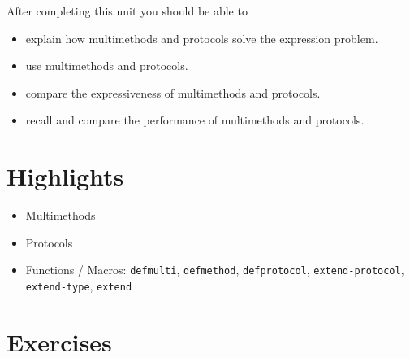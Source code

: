 \documentclass[11pt,a4paper]{article}
\begin{document}
After completing this unit you should be able to

\begin{itemize}
    \item explain how multimethods and protocols solve the expression problem.
    \item use multimethods and protocols.
    \item compare the expressiveness of multimethods and protocols.
    \item recall and compare the performance of multimethods and protocols.
\end{itemize}

\section{Highlights}

\begin{itemize}
    \item Multimethods
    \item Protocols
    \item Functions / Macros: \verb|defmulti|, \verb|defmethod|, \verb|defprotocol|, \verb|extend-protocol|, \verb|extend-type|, \verb|extend|
\end{itemize}



\section{Exercises}
\end{document}
